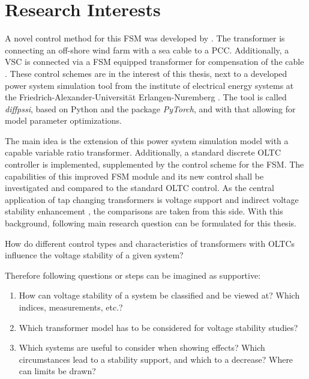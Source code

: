 \newpage

\section{Research Interests}
\label{sec:research-interests}

A novel control method for this \acs{FSM} was developed by \textcite{burlakin_2024}.
The transformer is connecting an off-shore wind farm with a sea cable to a \ac{PCC}.
Additionally, a \acf{VSC} is connected via a \acs{FSM} equipped transformer for compensation of the cable \autocite{burlakin_2024a}.
These control schemes are in the interest of this thesis, next to a developed power system simulation tool from the institute of electrical energy systems at the Friedrich-Alexander-Universität Erlangen-Nuremberg \autocite{kordowich_2023}.
The tool is called \textit{diffpssi}, based on Python and the package \textit{PyTorch}, and with that allowing for model parameter optimizations.

The main idea is the extension of this power system simulation model with a capable variable ratio transformer.
Additionally, a standard discrete \acs{OLTC} controller is implemented, supplemented by the control scheme for the \acs{FSM}.
The capabilities of this improved \acs{FSM} module and its new control shall be investigated and compared to the standard \acs{OLTC} control.
As the central application of tap changing transformers is voltage support and indirect voltage stability enhancement \autocite{kundur_2022,milano_2010}, the comparisons are taken from this side.
With this background, following main research question can be formulated for this thesis.

\begin{tcolorbox}[float, colback=ees_blue!5!white,colframe=ees_blue, toptitle=1mm, bottomtitle=1mm, left=2mm, right=2.5mm, top=2mm, bottom=2mm, title={\textbf{Research Question of this Thesis}}]
    How do different control types and characteristics of transformers with \acfp{OLTC} influence the voltage stability of a given system?
\end{tcolorbox}

Therefore following questions or steps can be imagined as supportive:
\begin{enumerate}
    \item How can voltage stability of a system be classified and be viewed at? Which indices, measurements, etc.?
    \item Which transformer model has to be considered for voltage stability studies?
    \item Which systems are useful to consider when showing effects? Which circumstances lead to a stability support, and which to a decrease? Where can limits be drawn?
\end{enumerate}

